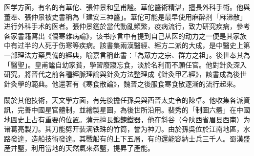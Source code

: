 医学方面，有名的有華佗、張仲景和皇甫謐。華佗醫術精湛，擅長外科手術。他與董奉、張仲景被史書稱為「建安三神醫」。華佗可能是最早使用麻醉剂「麻沸散」进行外科手术的医者。張仲景鑑於當代動亂頻繁，疫病流行，致力研究疾病，參考各家書籍寫出《傷寒雜病論》，该书序言中有提到自己从医的动力之一便是其家族中有过半的人死于伤寒等疾病。該書集兩漢醫經、經方二派的大成，是中醫史上第一部理法方藥具備的經典，喻嘉言稱此書：「為眾方之宗、群方之祖」。後世奉其為「醫聖」。皇甫謐自幼家貧，學習廢寢忘食，淡於名利而不願任官。他對針灸深入研究，將晉代之前各種經脈理論與針灸方法整理成《針灸甲乙經》，該書成為後世針灸學的範典。他還著有《寒食散論》，魏晉之後服食寒食散逐漸的流行起來。

關於其他技術，天文學方面，有先後擔任孫吳與西晉太史令的陳卓。他收集各派資訊，完善中國星官體制，並繪製星圖，為後世所沿用。裴秀的「制圖六體」在中國地圖史上占有重要的位置。蒲元擅長鍛鍊鐵器，他在斜谷（今陕西省眉县西南）为诸葛亮製刀。其刀能劈开装满铁珠的竹筒，誉为神刀。由於孫吳位於江南地區，水路發達，造船技術發達。其戰船有的上下五層，有的還能容納士兵三千人。蜀漢盛産井鹽，利用當地的天然氣來煮鹽，提昇了產能。






